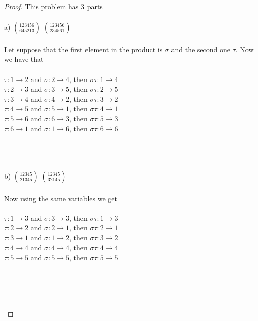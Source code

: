 \documentclass[12pt]{article}
\begin{document}
\begin{proof}
This problem has 3 parts \\ \\
a) $\displaystyle{1 2 3 4 5 6 \choose 6 4 5 2 1 3}$ $\displaystyle{123456 \choose 234561}$ \\ \\
Let suppose that the first element in the product is $\sigma$ and the second one $\tau$. Now we have that \\ \\
$\tau : 1 \rightarrow 2$ and $\sigma : 2 \rightarrow 4$, then $\sigma \tau :1 \rightarrow 4$ \\
$\tau : 2 \rightarrow 3$ and $\sigma : 3 \rightarrow 5$, then $\sigma \tau :2 \rightarrow 5$ \\
$\tau : 3 \rightarrow 4$ and $\sigma : 4 \rightarrow 2$, then $\sigma \tau :3 \rightarrow 2$ \\
$\tau : 4 \rightarrow 5$ and $\sigma : 5 \rightarrow 1$, then $\sigma \tau :4 \rightarrow 1$ \\
$\tau : 5 \rightarrow 6$ and $\sigma : 6 \rightarrow 3$, then $\sigma \tau :5 \rightarrow 3$ \\
$\tau : 6 \rightarrow 1$ and $\sigma : 1 \rightarrow 6$, then $\sigma \tau :6 \rightarrow 6$ \\ \\
\centerline{} \\ \\
\bigskip
b) $\displaystyle{1 2 3 4 5  \choose 21345}$ $\displaystyle{12345 \choose 32145}$ \\ \\
Now using the same variables we get \\ \\
$\tau : 1 \rightarrow 3$ and $\sigma : 3 \rightarrow 3$, then $\sigma \tau :1 \rightarrow 3$ \\
$\tau : 2 \rightarrow 2$ and $\sigma : 2 \rightarrow 1$, then $\sigma \tau :2 \rightarrow 1$ \\
$\tau : 3 \rightarrow 1$ and $\sigma : 1 \rightarrow 2$, then $\sigma \tau :3 \rightarrow 2$ \\
$\tau : 4 \rightarrow 4$ and $\sigma : 4 \rightarrow 4$, then $\sigma \tau :4 \rightarrow 4$ \\
$\tau : 5 \rightarrow 5$ and $\sigma : 5 \rightarrow 5$, then $\sigma \tau :5 \rightarrow 5$ \\ \\
\centerline{} \\ \\ \\

\end{proof}
\end{document}
